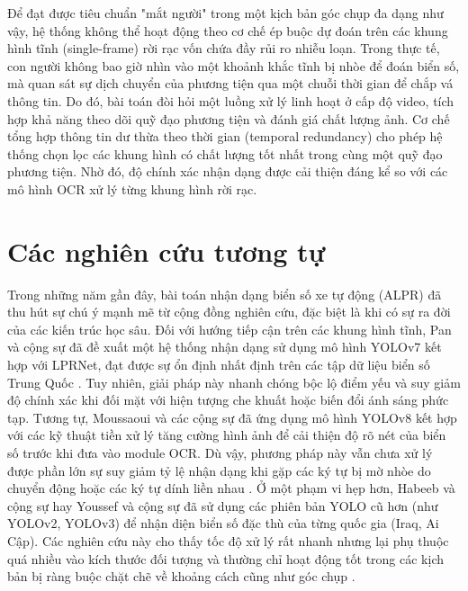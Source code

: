 \documentclass[../DoAn.tex]{subfiles}
\begin{document}
Để đạt được tiêu chuẩn "mắt người" trong một kịch bản góc chụp đa dạng như vậy, hệ thống không thể hoạt động theo cơ chế ép buộc dự đoán trên các khung hình tĩnh (single-frame) rời rạc vốn chứa đầy rủi ro nhiễu loạn. Trong thực tế, con người không bao giờ nhìn vào một khoảnh khắc tĩnh bị nhòe để đoán biển số, mà quan sát sự dịch chuyển của phương tiện qua một chuỗi thời gian để chắp vá thông tin. Do đó, bài toán đòi hỏi một luồng xử lý linh hoạt ở cấp độ video, tích hợp khả năng theo dõi quỹ đạo phương tiện và đánh giá chất lượng ảnh. Cơ chế tổng hợp thông tin dư thừa theo thời gian (temporal redundancy) cho phép hệ thống chọn lọc các khung hình có chất lượng tốt nhất trong cùng một quỹ đạo phương tiện. Nhờ đó, độ chính xác nhận dạng được cải thiện đáng kể so với các mô hình OCR xử lý từng khung hình rời rạc.

\section{Các nghiên cứu tương tự}
\label{section:2.2}
Trong những năm gần đây, bài toán nhận dạng biển số xe tự động (ALPR) đã thu hút sự chú ý mạnh mẽ từ cộng đồng nghiên cứu, đặc biệt là khi có sự ra đời của các kiến trúc học sâu. Đối với hướng tiếp cận trên các khung hình tĩnh, Pan và cộng sự đã đề xuất một hệ thống nhận dạng sử dụng mô hình YOLOv7 kết hợp với LPRNet, đạt được sự ổn định nhất định trên các tập dữ liệu biển số Trung Quốc \cite{pan2023research}. Tuy nhiên, giải pháp này nhanh chóng bộc lộ điểm yếu và suy giảm độ chính xác khi đối mặt với hiện tượng che khuất hoặc biến đổi ánh sáng phức tạp. Tương tự, Moussaoui và các cộng sự đã ứng dụng mô hình YOLOv8 kết hợp với các kỹ thuật tiền xử lý tăng cường hình ảnh để cải thiện độ rõ nét của biển số trước khi đưa vào module OCR. Dù vậy, phương pháp này vẫn chưa xử lý được phần lớn sự suy giảm tỷ lệ nhận dạng khi gặp các ký tự bị mờ nhòe do chuyển động hoặc các ký tự dính liền nhau \cite{moussaoui2024enhancing}. Ở một phạm vi hẹp hơn, Habeeb và cộng sự hay Youssef và cộng sự đã sử dụng các phiên bản YOLO cũ hơn (như YOLOv2, YOLOv3) để nhận diện biển số đặc thù của từng quốc gia (Iraq, Ai Cập). Các nghiên cứu này cho thấy tốc độ xử lý rất nhanh nhưng lại phụ thuộc quá nhiều vào kích thước đối tượng và thường chỉ hoạt động tốt trong các kịch bản bị ràng buộc chặt chẽ về khoảng cách cũng như góc chụp \cite{habeeb2021deep}.
\end{document}
